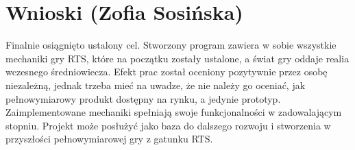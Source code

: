 \section{Wnioski (Zofia Sosińska)}
Finalnie osiągnięto ustalony cel. Stworzony program zawiera w sobie wszystkie mechaniki gry RTS,
które na początku zostały ustalone, a świat gry oddaje realia wczesnego średniowiecza. 
Efekt prac został oceniony pozytywnie przez osobę niezależną, jednak trzeba mieć na uwadze, 
że nie należy go oceniać, jak pełnowymiarowy produkt dostępny na rynku, a jedynie prototyp.
Zaimplementowane mechaniki spełniają swoje funkcjonalności w zadowalającym stopniu. 
Projekt może posłużyć jako baza do dalszego rozwoju i stworzenia w przyszłości pełnowymiarowej
gry z gatunku RTS.